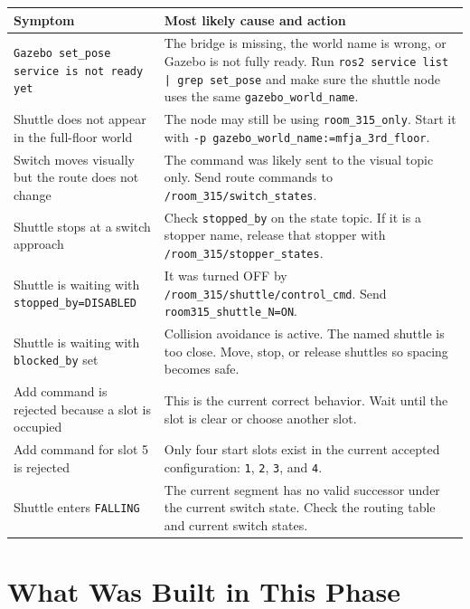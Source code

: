\documentclass[12pt,a4paper]{report}
\begin{document}
\begin{longtable}{@{}p{}p{}@{}}
\toprule
Symptom & Most likely cause and action \\
\midrule
\endhead
\texttt{Gazebo set\_pose service is not ready yet} &
The bridge is missing, the world name is wrong, or Gazebo is not fully ready.
Run \texttt{ros2 service list | grep set\_pose} and make sure the shuttle node
uses the same \texttt{gazebo\_world\_name}. \\
\addlinespace
Shuttle does not appear in the full-floor world &
The node may still be using \texttt{room\_315\_only}. Start it with
\texttt{-p gazebo\_world\_name:=mfja\_3rd\_floor}. \\
\addlinespace
Switch moves visually but the route does not change &
The command was likely sent to the visual topic only. Send route commands to
\texttt{/room\_315/switch\_states}. \\
\addlinespace
Shuttle stops at a switch approach &
Check \texttt{stopped\_by} on the state topic. If it is a stopper name, release
that stopper with \texttt{/room\_315/stopper\_states}. \\
\addlinespace
Shuttle is waiting with \texttt{stopped\_by=DISABLED} &
It was turned OFF by \texttt{/room\_315/shuttle/control\_cmd}. Send
\texttt{room315\_shuttle\_N=ON}. \\
\addlinespace
Shuttle is waiting with \texttt{blocked\_by} set &
Collision avoidance is active. The named shuttle is too close. Move, stop, or
release shuttles so spacing becomes safe. \\
\addlinespace
Add command is rejected because a slot is occupied &
This is the current correct behavior. Wait until the slot is clear or choose
another slot. \\
\addlinespace
Add command for slot 5 is rejected &
Only four start slots exist in the current accepted configuration:
\texttt{1}, \texttt{2}, \texttt{3}, and \texttt{4}. \\
\addlinespace
Shuttle enters \texttt{FALLING} &
The current segment has no valid successor under the current switch state. Check
the routing table and current switch states. \\
\bottomrule
\end{longtable}

\chapter{What Was Built in This Phase}
\end{document}
